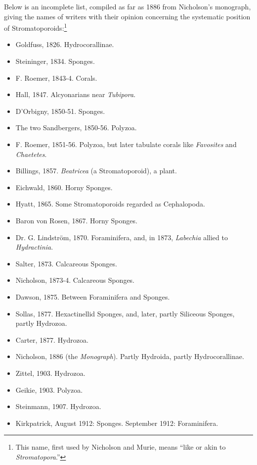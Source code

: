 \documentclass[a4paper, 12pt, oneside]{article}
\begin{document}
Below is an incomplete list, compiled as far as 1886 from Nicholson's monograph, giving the names of writers with their opinion concerning the systematic position of Stromatoporoids:\footnote{This name, first used by Nicholson and Murie, means ``like or akin to \emph{Stromatopora}.''}
\begin{itemize}
    \item Goldfuss, 1826. Hydrocorallinae.
    \item Steininger, 1834. Sponges.
    \item F. Roemer, 1843-4. Corals.
    \item Hall, 1847. Alcyonarians near \emph{Tubipora}.
    \item D'Orbigny, 1850-51. Sponges.
    \item The two Sandbergers, 1850-56. Polyzoa.
    \item F. Roemer, 1851-56. Polyzoa, but later tabulate corals like \emph{Favosites} and \emph{Chaetetes}.
    \item Billings, 1857. \emph{Beatricea} (a Stromatoporoid), a plant.
    \item Eichwald, 1860. Horny Sponges.
    \item Hyatt, 1865. Some Stromatoporoids regarded as Cephalopoda.
    \item Baron von Rosen, 1867. Horny Sponges.
    \item Dr. G. Lindström, 1870. Foraminifera, and, in 1873, \emph{Labechia} allied to \emph{Hydractinia}.
    \item Salter, 1873. Calcareous Sponges.
    \item Nicholson, 1873-4. Calcareous Sponges.
    \item Dawson, 1875. Between Foraminifera and Sponges.
    \item Sollas, 1877. Hexactinellid Sponges, and, later, partly Siliceous Sponges, partly Hydrozoa.
    \item Carter, 1877. Hydrozoa.
    \item Nicholson, 1886 (the \emph{Monograph}). Partly Hydroida, partly Hydrocorallinae.
    \item Zittel, 1903. Hydrozoa.
    \item Geikie, 1903. Polyzoa.
    \item Steinmann, 1907. Hydrozoa.
    \item Kirkpatrick, August 1912: Sponges. September 1912: Foraminifera.
\end{itemize}
\end{document}
